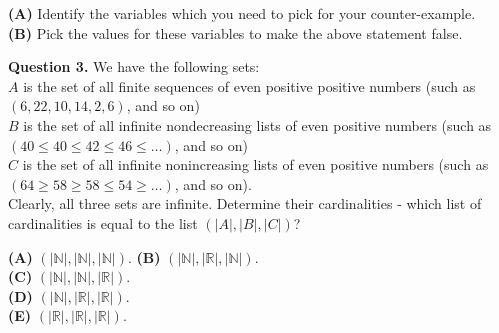 \documentclass[jou]{apa6}
\begin{document}
\noindent
{\bf (A)} Identify the variables which you need to pick for your counter-example.\\
{\bf (B)} Pick the values for these variables to make the above statement false.


\vspace{6pt}
{\bf Question 3.} We have the following sets:\\
$A$ is the set of all finite sequences of even positive positive numbers (such as $(6,22,10,14,2,6)$, and so on)\\
$B$ is the set of all infinite nondecreasing lists of even positive numbers (such as $(40 \leq 40 \leq 42 \leq 46 \leq \ldots)$, and so on)\\
$C$ is the set of all infinite nonincreasing lists of even positive numbers (such as $(64 \geq 58 \geq 58 \leq 54 \geq \ldots)$, and so on).\\
Clearly, all three sets are infinite. Determine their cardinalities - which list 
of cardinalities is equal to the list  $(|A|,|B|,|C|)$?

{\large
\noindent
{\bf (A)} $\left( \left| \mathbb{N} \right|, \left| \mathbb{N} \right|, \left| \mathbb{N} \right| \right)$. 
{\bf (B)} $\left( \left| \mathbb{N} \right|, \left| \mathbb{R} \right|, \left| \mathbb{N} \right| \right)$.\\
{\bf (C)} $\left( \left| \mathbb{N} \right|, \left| \mathbb{N} \right|, \left| \mathbb{R} \right| \right)$.\\
{\bf (D)} $\left( \left| \mathbb{N} \right|, \left| \mathbb{R} \right|, \left| \mathbb{R} \right| \right)$.\\
{\bf (E)} $\left( \left| \mathbb{R} \right|, \left| \mathbb{R} \right|, \left| \mathbb{R} \right| \right)$.\\
}
\end{document}
